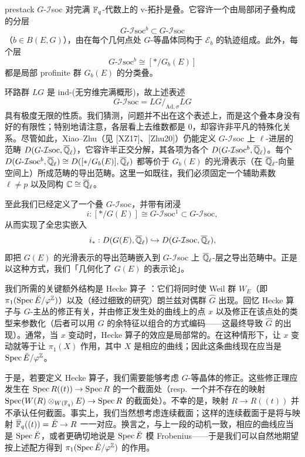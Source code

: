 \begin{theorem}%
prestack $G$-$\mathcal{I}$soc 对完满 $\mathbb{F}_q$-代数上的 v-拓扑是叠。它容许一个由局部闭子叠构成的分层
\[
  G\text{-}\mathcal{I}\mathrm{soc}^b \subset G\text{-}\mathcal{I}\mathrm{soc}
\]
（$b\in B(E,G)$），由在每个几何点处 $G$-等晶体同构于 $\mathcal{E}_b$ 的轨迹组成。此外，每个层
\[
  G\text{-}\mathcal{I}\mathrm{soc}^b \cong [\ast/G_b(E)]
\]
都是局部 profinite 群 $G_b(E)$ 的分类叠。
\end{theorem}

环路群 $LG$ 是 ind-(无穷维完满概形)，故上述表述
\[
  G\text{-}\mathcal{I}\mathrm{soc} = LG/_{\mathrm{Ad},\sigma}LG
\]
具有极度无限的性质。我们猜测，问题并不出在这个表述上，而是这个叠本身没有好的有限性；特别地请注意，各层看上去维数都是 $0$，却容许非平凡的特殊化关系。尽管如此，Xiao–Zhu（见 [XZ17]、[Zhu20]）仍能定义 $G$-$\mathcal{I}$soc 上 $\ell$-进层的范畴 $D(G\text{-}\mathcal{I}\mathrm{soc},\overline{\mathbb{Q}}_\ell)$，它容许半正交分解，其各项为各个 $D(G\text{-}\mathcal{I}\mathrm{soc}^b,\overline{\mathbb{Q}}_\ell)$。每个 $D(G\text{-}\mathcal{I}\mathrm{soc}^b,\overline{\mathbb{Q}}_\ell)\cong D([\ast/G_b(E)],\overline{\mathbb{Q}}_\ell)$ 都等价于 $G_b(E)$ 的光滑表示（在 $\overline{\mathbb{Q}}_\ell$-向量空间上）所成范畴的导出范畴。这里一如既往，我们必须固定一个辅助素数 $\ell\neq p$ 以及同构 $\mathbb{C}\cong\overline{\mathbb{Q}}_\ell$。

至此我们已经定义了一个叠 $G$-$\mathcal{I}$soc，并带有闭浸
\[
  i : [\ast/G(E)] \cong G\text{-}\mathcal{I}\mathrm{soc}^1 \subset G\text{-}\mathcal{I}\mathrm{soc},
\]
从而实现了全忠实嵌入
\[
  i_\ast : D(G(E),\overline{\mathbb{Q}}_\ell) \hookrightarrow D(G\text{-}\mathcal{I}\mathrm{soc},\overline{\mathbb{Q}}_\ell),
\]
即把 $G(E)$ 的光滑表示的导出范畴嵌入到 $G$-$\mathcal{I}$soc 上 $\overline{\mathbb{Q}}_\ell$-层之导出范畴中。正是以这种方式，我们「几何化了 $G(E)$ 的表示论」。

我们所需的关键额外结构是 Hecke 算子
：它们将同时使 Weil 群 $W_E$（即 $\pi_1(\operatorname{Spec}\breve{E}/\varphi^{\mathbb{Z}})$）以及（经过细致的研究）朗兰兹对偶群 $\widehat{G}$ 出现。回忆 Hecke 算子与 $G$-主丛的修正有关，并由修正发生处的曲线上的点 $x$ 以及修正在该点处的类型来参数化（后者可以用 $G$ 的余特征以组合的方式编码——这最终导致 $\widehat{G}$ 的出现）。通常，当 $x$ 变动时，Hecke 算子的效应是局部常的。在这种情形下，让 $x$ 变动就等于让 $\pi_1(X)$ 作用，其中 $X$ 是相应的曲线；因此这条曲线现在应当是 $\operatorname{Spec}\breve{E}/\varphi^{\mathbb{Z}}$。

于是，若要定义 Hecke 算子，我们需要能够考虑 $G$-等晶体的修正。这些修正理应发生在 $\operatorname{Spec} R((t))\to\operatorname{Spec} R$ 的一个截面处（resp.\ 一个并不存在的映射 $\operatorname{Spec}(W(R)\otimes_{W(\mathbb{F}_q)}E)\to\operatorname{Spec} R$ 的截面处）。不幸的是，映射 $R\to R((t))$ 并不承认任何截面。事实上，我们当然想考虑连续截面；这样的连续截面于是将与映射 $\overline{\mathbb{F}}_q((t))=\breve{E}\to R$ 一一对应。换言之，与上一段的动机一致，相应的曲线应当是 $\operatorname{Spec}\breve{E}$，或者更确切地说是 $\operatorname{Spec}\breve{E}$ 模 Frobenius——于是我们可以自然地期望按上述配方得到 $\pi_1(\operatorname{Spec}\breve{E}/\varphi^{\mathbb{Z}})$ 的作用。

